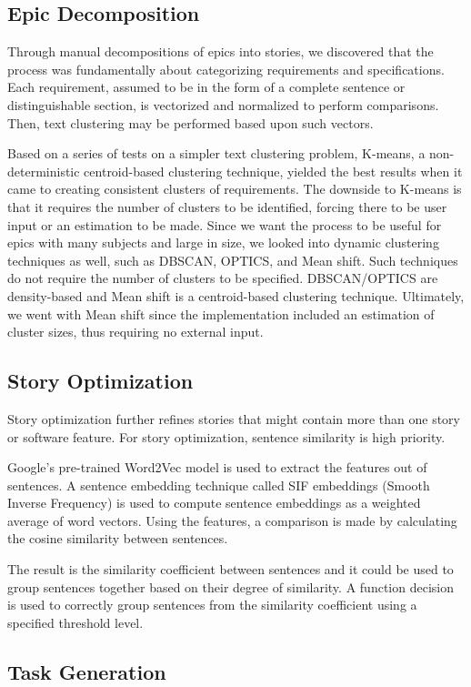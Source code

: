 \subsection{Epic Decomposition}
Through manual decompositions of epics into stories, we discovered that the process was fundamentally about categorizing requirements and specifications. Each requirement, assumed to be in the form of a complete sentence or distinguishable section, is vectorized and normalized to perform comparisons. Then, text clustering may be performed based upon such vectors. 

Based on a series of tests on a simpler text clustering problem, K-means, a non-deterministic centroid-based clustering technique, yielded the best results when it came to creating consistent clusters of requirements. The downside to K-means is that it requires the number of clusters to be identified, forcing there to be user input or an estimation to be made. Since we want the process to be useful for epics with many subjects and large in size, we looked into dynamic clustering techniques as well, such as DBSCAN, OPTICS, and Mean shift. Such techniques do not require the number of clusters to be specified. DBSCAN/OPTICS are density-based and Mean shift is a centroid-based clustering technique. Ultimately, we went with Mean shift since the implementation included an estimation of cluster sizes, thus requiring no external input.

\subsection{Story Optimization}
Story optimization further refines stories that might contain more than one story or software feature. For story optimization, sentence similarity is high priority. 

Google's pre-trained Word2Vec model\cite{googleword2vec} is used to extract the features out of sentences. A sentence embedding technique called SIF embeddings (Smooth Inverse Frequency) is used to compute sentence embeddings as a weighted average of word vectors. Using the features, a comparison is made by calculating the cosine similarity between sentences. 

The result is the similarity coefficient between sentences and it could be used to group sentences together based on their degree of similarity. A function decision is used to correctly group sentences from the similarity coefficient using a specified threshold level. 

\subsection{Task Generation}

